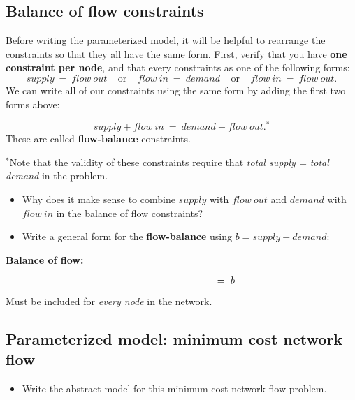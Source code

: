 \documentclass[11pt]{article}
\theoremstyle{definition}
\begin{document}
\newpage
\subsection{Balance of flow constraints}
Before writing the parameterized model, it will be helpful to rearrange the constraints so that they all have the same form.  First, verify that you have \textbf{one constraint per node}, and that every constraints as one of the following  forms:
\[
supply ~=~ flow~out  ~~~~~\text{or}~~~~~  flow~in ~=~ demand ~~~~~\text{or}~~~~~  flow~in ~=~ flow~out.
\]
We can write all of our constraints using the same form by adding the first two forms above:
\begin{tcolorbox}
\[
supply + flow~in ~=~ demand + flow~out.^*
\]
These are called \textbf{flow-balance} constraints.
\end{tcolorbox}
$^*$Note that the validity of these constraints require that \emph{total supply = total demand} in the problem. 

\begin{itemize}
\item Why does it make sense to combine $supply$ with $flow~out$ and $demand$ with $flow~in$ in the balance of flow constraints?
\vfill

\item Write a general form for the \textbf{flow-balance} using $b = supply - demand$:

\end{itemize}
\vfill
\begin{tcolorbox}
\textbf{Balance of flow:} 
\begin{center}
 $ \hspace{1.5in}  \hspace{1.5in} = ~ b$
 \end{center}
 Must be included for \emph{every node} in the network.
\end{tcolorbox}

\newpage


\subsection{Parameterized model: minimum cost network flow}
\begin{itemize}
\item  Write the abstract model for this minimum cost network flow problem.  
\vfill \vfill
\end{itemize}
\end{document}
